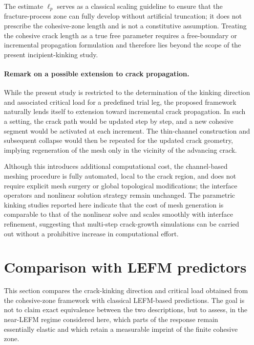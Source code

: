 \documentclass[smallextended]{svjour3}       %
\begin{document}
The estimate \(\ell_p\) serves as a classical scaling guideline to ensure
that the fracture-process zone can fully develop without artificial
truncation; it does not prescribe the cohesive-zone length and is not a
constitutive assumption. Treating the cohesive crack length as a true free
parameter requires a free-boundary or incremental propagation formulation and
therefore lies beyond the scope of the present incipient-kinking study.

\paragraph{Remark on a possible extension to crack propagation.}
While the present study is restricted to the determination of the kinking
direction and associated critical load for a predefined trial leg, the
proposed framework naturally lends itself to extension toward incremental
crack propagation. In such a setting, the crack path would be updated step by
step, and a new cohesive segment would be activated at each increment. The
thin-channel construction and subsequent collapse would then be repeated for
the updated crack geometry, implying regeneration of the mesh only in the
vicinity of the advancing crack.

Although this introduces additional computational cost, the channel-based
meshing procedure is fully automated, local to the crack region, and does not
require explicit mesh surgery or global topological modifications; the
interface operators and nonlinear solution strategy remain unchanged. The
parametric kinking studies reported here indicate that the cost of mesh
generation is comparable to that of the nonlinear solve and scales smoothly
with interface refinement, suggesting that multi-step crack-growth
simulations can be carried out without a prohibitive increase in
computational effort.


\section{Comparison with LEFM predictors}
\label{sec:LEFM-comparison}

This section compares the crack-kinking direction and critical load obtained
from the cohesive-zone framework with classical LEFM-based predictions. The
goal is not to claim exact equivalence between the two descriptions, but to
assess, in the near-LEFM regime considered here, which parts of the response
remain essentially elastic and which retain a measurable imprint of the
finite cohesive zone.
\end{document}
